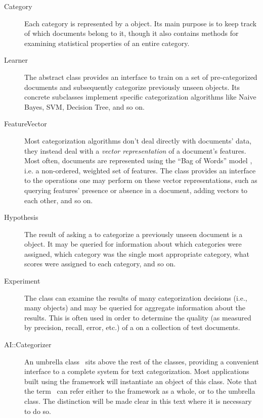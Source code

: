 \begin{description}
\item[Category]

Each category is represented by a  object.  Its main purpose
is to keep track of which documents belong to it, though it also
contains methods for examining statistical properties of an entire
category.

\item[Learner]

The abstract  class provides an interface to train on a
set of pre-categorized documents and subsequently categorize
previously unseen  objects.  Its
concrete subclasses implement specific categorization algorithms like
Naive Bayes, SVM, Decision Tree, and so on.

\item[FeatureVector]

Most categorization algorithms don't deal directly with documents'
data, they instead deal with a \emph{vector representation} of a
document's features.  Most often, documents are represented using the
``Bag of Words'' model \cite{XXX}, i.e. a non-ordered, weighted set of
features.  The  class provides an interface to the
operations one may perform on these vector representations, such as
querying features' presence or absence in a document, adding vectors
to each other, and so on.

\item[Hypothesis]

The result of asking a  to categorize a previously unseen
document is a  object.  It may be queried for information
about which categories were assigned, which category was the single
most appropriate category, what scores were assigned to each category,
and so on.

\item[Experiment]

The  class can examine the results of many categorization
decisions (i.e., many  objects) and may be queried for
aggregate information about the results.  This is often used in order
to determine the quality (as measured by precision, recall, error,
etc.) of a  on a collection of test documents.

\item[AI::Categorizer]

An umbrella class \aicat\ sits above the rest of the classes,
providing a convenient interface to a complete system for text
categorization.  Most applications built using the framework will
instantiate an object of this class.  Note that the term \aicat\ can
refer either to the framework as a whole, or to the umbrella class.
The distinction will be made clear in this text where it is necessary
to do so.

\end{description}

